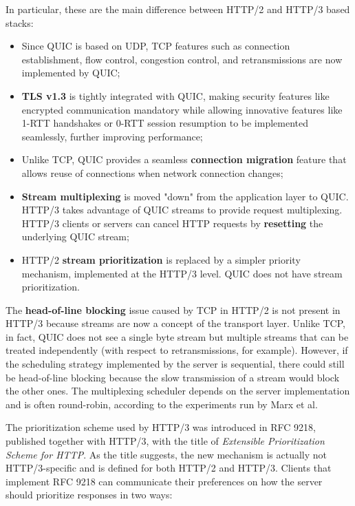 In particular, these are the main difference between HTTP/2 and HTTP/3 based stacks:

\begin{itemize}
    \item Since QUIC is based on UDP, TCP features such as connection establishment, flow control, congestion control, and retransmissions are now implemented by QUIC;
    \item \textbf{TLS v1.3} is tightly integrated with QUIC, making security features like encrypted communication mandatory while allowing innovative features like 1-RTT handshakes or 0-RTT session resumption to be implemented seamlessly, further improving performance;
    \item Unlike TCP, QUIC provides a seamless \textbf{connection migration} feature that allows reuse of connections when network connection changes;
    \item \textbf{Stream multiplexing} is moved "down" from the application layer to QUIC. HTTP/3 takes advantage of QUIC streams to provide request multiplexing. HTTP/3 clients or servers can cancel HTTP requests by \textbf{resetting} the underlying QUIC stream;
    \item HTTP/2 \textbf{stream prioritization} is replaced by a simpler priority mechanism, implemented at the HTTP/3 level. QUIC does not have stream prioritization.
\end{itemize}


The \textbf{head-of-line blocking} issue caused by TCP in HTTP/2 is not present in HTTP/3 because streams are now a concept of the transport layer. Unlike TCP, in fact, QUIC does not see a single byte stream but multiple streams that can be treated independently (with respect to retransmissions, for example). However, if the scheduling strategy implemented by the server is sequential, there could still be head-of-line blocking because the slow transmission of a stream would block the other ones. The multiplexing scheduler depends on the server implementation and is often round-robin, according to the experiments run by Marx et al.\cite{quicdiversity}

The prioritization scheme used by HTTP/3 was introduced in RFC 9218, published together with HTTP/3, with the title of \textit{Extensible Prioritization Scheme for HTTP}. As the title suggests, the new mechanism is actually not HTTP/3-specific and is defined for both HTTP/2 and HTTP/3. Clients that implement RFC 9218 can communicate their preferences on how the server should prioritize responses in two ways:\cite{rfc9218}

